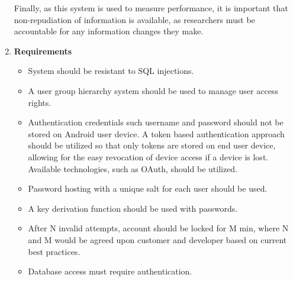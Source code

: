 \documentclass[a4paper,10pt]{article}
\begin{document}
\begin{enumerate}
Finally, as this system is used to measure performance, it is important that non-repudiation of information is available, as researchers must be accountable for any information changes they make.
\item \textbf{Requirements}
	\begin{itemize}
		\item System should be resistant to SQL injections.
		\item A user group hierarchy system should be used to manage user access rights.
		\item Authentication credentials such username and password should not be stored on Android user device. A token based authentication approach should be utilized so that only tokens are stored on end user device, allowing for the easy revocation of device access if a device is lost. Available technologies, such as OAuth, should be utilized.
		\item Password hosting with a unique salt for each user should be used.
		\item A key derivation function should be used with passwords. 
		\item After N invalid attempts, account should be locked for M min, where N and M would be agreed upon customer and developer based on current best practices.
		\item Database access must require authentication.
	\end{itemize}
\end{enumerate}
\end{document}
